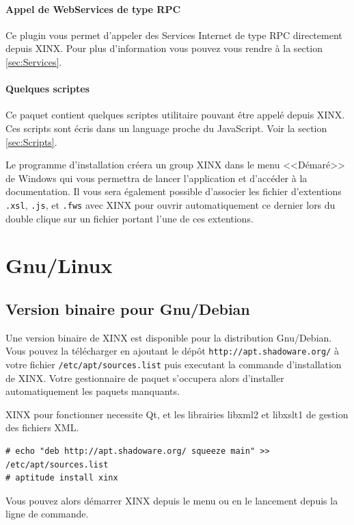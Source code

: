 \documentclass[a4paper,10pt,twoside]{book}
\begin{document}
\paragraph{Appel de WebServices de type RPC} Ce plugin vous permet d'appeler des Services Internet de type RPC directement depuis XINX. Pour plus d'information vous pouvez vous rendre à la section \ref{sec:Services}.
\paragraph{Quelques scriptes} Ce paquet contient quelques scriptes utilitaire pouvant être appelé depuis XINX. Ces scripts sont écris dans un language proche du JavaScript. Voir la section \ref{sec:Scripts}.

Le programme d'installation créera un group XINX dans le menu <<Démaré>> de Windows qui vous permettra de lancer l'application et d'accéder à la documentation. Il vous sera également possible d'associer les fichier d'extentions \verb+.xsl+, \verb+.js+, et \verb+.fws+ avec XINX pour ouvrir automatiquement ce dernier lors du double clique sur un fichier portant l'une de ces extentions.

\section{Gnu/Linux}

\subsection{Version binaire pour Gnu/Debian}

Une version binaire de XINX est disponible pour la distribution Gnu/Debian. Vous pouvez la télécharger en ajoutant le dépôt \verb+http://apt.shadoware.org/+ à votre fichier \verb+/etc/apt/sources.list+ puis executant la commande d'installation de XINX. Votre gestionnaire de paquet s'occupera alors d'installer automatiquement les paquets manquants. 

XINX pour fonctionner necessite Qt, et les librairies libxml2 et libxslt1 de gestion des fichiers XML.

\begin{verbatim}
# echo "deb http://apt.shadoware.org/ squeeze main" >> /etc/apt/sources.list
# aptitude install xinx
\end{verbatim}

Vous pouvez alors démarrer XINX depuis le menu ou en le lancement depuis la ligne de commande. 
\end{document}
